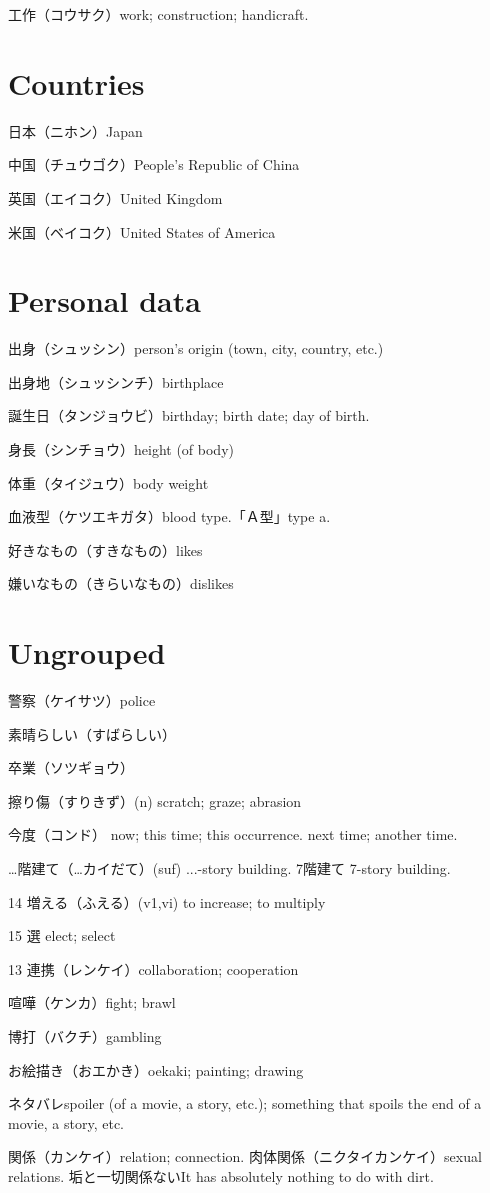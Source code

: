 工作（コウサク）work; construction; handicraft.

\section{Countries}

日本（ニホン）Japan

中国（チュウゴク）People's Republic of China

英国（エイコク）United Kingdom

米国（ベイコク）United States of America

\section{Personal data}

出身（シュッシン）person's origin (town, city, country, etc.)

出身地（シュッシンチ）birthplace

誕生日（タンジョウビ）birthday; birth date; day of birth.

身長（シンチョウ）height (of body)

体重（タイジュウ）body weight

血液型（ケツエキガタ）blood type.「Ａ型」type a.

好きなもの（すきなもの）likes

嫌いなもの（きらいなもの）dislikes

\section{Ungrouped}

警察（ケイサツ）police

素晴らしい（すばらしい）

卒業（ソツギョウ）

擦り傷（すりきず）(n) scratch; graze; abrasion

今度（コンド）
now; this time; this occurrence.
next time; another time.

…階建て（…カイだて）(suf) ...-story building.
7階建て 7-story building.

14 増える（ふえる）(v1,vi) to increase; to multiply

15 選 elect; select

13 連携（レンケイ）collaboration; cooperation

喧嘩（ケンカ）fight; brawl

博打（バクチ）gambling

お絵描き（おエかき）oekaki; painting; drawing

ネタバレspoiler (of a movie, a story, etc.); something that spoils the end of a movie, a story, etc.

関係（カンケイ）relation; connection.
肉体関係（ニクタイカンケイ）sexual relations.
垢と一切関係ないIt has absolutely nothing to do with dirt.
